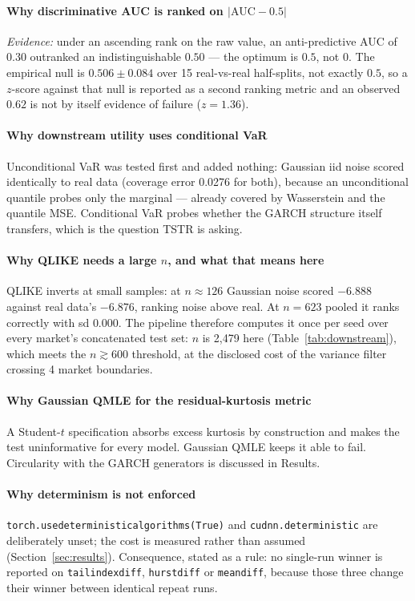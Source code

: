 \documentclass[11pt,a4paper]{article}
\makeatletter
\DeclareRobustCommand{\_}{\ifmmode\nfss@text{\textunderscore}\else\textunderscore\allowbreak\fi}
\makeatother
\begin{document}
\paragraph{Why discriminative AUC is ranked on $|\text{AUC}-0.5|$} \textit{Evidence:} under an ascending rank on the raw value, an anti-predictive AUC of $0.30$ outranked an indistinguishable $0.50$ --- the optimum is $0.5$, not $0$. The empirical null is $0.506\pm0.084$ over 15 real-vs-real half-splits, not exactly $0.5$, so a $z$-score against that null is reported as a second ranking metric and an observed $0.62$ is not by itself evidence of failure ($z=1.36$).

\paragraph{Why downstream utility uses conditional VaR} Unconditional VaR was tested first and added nothing: Gaussian iid noise scored identically to real data (coverage error 0.0276 for both), because an unconditional quantile probes only the marginal --- already covered by Wasserstein and the quantile MSE. Conditional VaR probes whether the GARCH structure itself transfers, which is the question TSTR is asking.

\paragraph{Why QLIKE needs a large $n$, and what that means here} QLIKE inverts at small samples: at $n\approx126$ Gaussian noise scored $-6.888$ against real data's $-6.876$, ranking noise above real. At $n=623$ pooled it ranks correctly with sd $0.000$. The pipeline therefore computes it once per seed over every market's concatenated test set: $n$ is 2,479 here (Table~\ref{tab:downstream}), which meets the $n\gtrsim600$ threshold, at the disclosed cost of the variance filter crossing 4 market boundaries.

\paragraph{Why Gaussian QMLE for the residual-kurtosis metric} A Student-$t$ specification absorbs excess kurtosis by construction and makes the test uninformative for every model. Gaussian QMLE keeps it able to fail. Circularity with the GARCH generators is discussed in Results.

\paragraph{Why determinism is not enforced} \texttt{torch.use\_deterministic\_algorithms(True)} and \texttt{cudnn.deterministic} are deliberately unset; the cost is measured rather than assumed (Section~\ref{sec:results}). Consequence, stated as a rule: no single-run winner is reported on \texttt{tail\_index\_diff}, \texttt{hurst\_diff} or \texttt{mean\_diff}, because those three change their winner between identical repeat runs.
\end{document}
